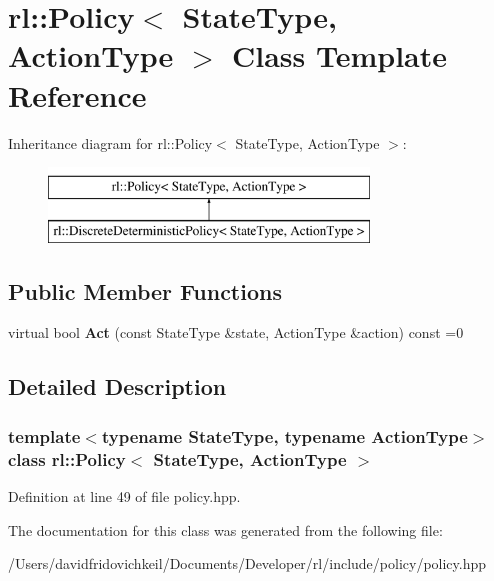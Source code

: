 \hypertarget{classrl_1_1_policy}{}\section{rl\+:\+:Policy$<$ State\+Type, Action\+Type $>$ Class Template Reference}
\label{classrl_1_1_policy}
Inheritance diagram for rl\+:\+:Policy$<$ State\+Type, Action\+Type $>$\+:\begin{figure}[H]
\begin{center}
\leavevmode
\includegraphics[height=2.000000cm]{classrl_1_1_policy}
\end{center}
\end{figure}
\subsection*{Public Member Functions}
\begin{DoxyCompactItemize}
\item 
\hypertarget{classrl_1_1_policy_ad13f773fdd923376554d061eb181c944}{}\label{classrl_1_1_policy_ad13f773fdd923376554d061eb181c944} 
virtual bool {\bfseries Act} (const State\+Type \&state, Action\+Type \&action) const =0
\end{DoxyCompactItemize}


\subsection{Detailed Description}
\subsubsection*{template$<$typename State\+Type, typename Action\+Type$>$\newline
class rl\+::\+Policy$<$ State\+Type, Action\+Type $>$}



Definition at line 49 of file policy.\+hpp.



The documentation for this class was generated from the following file\+:\begin{DoxyCompactItemize}
\item 
/\+Users/davidfridovichkeil/\+Documents/\+Developer/rl/include/policy/policy.\+hpp\end{DoxyCompactItemize}
